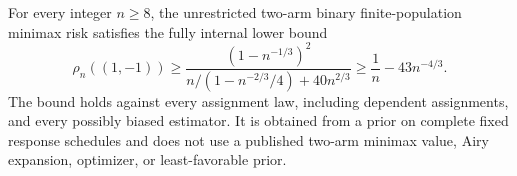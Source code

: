 For every integer \(n\geq8\), the unrestricted two-arm binary finite-population minimax risk satisfies the fully internal lower bound
\[
 \rho_n((1,-1))
 \geq
 \frac{(1-n^{-1/3})^2}
 {n/(1-n^{-2/3}/4)+40n^{2/3}}
 \geq \frac1n-43n^{-4/3}.
\]
The bound holds against every assignment law, including dependent assignments, and every possibly biased estimator. It is obtained from a prior on complete fixed response schedules and does not use a published two-arm minimax value, Airy expansion, optimizer, or least-favorable prior.